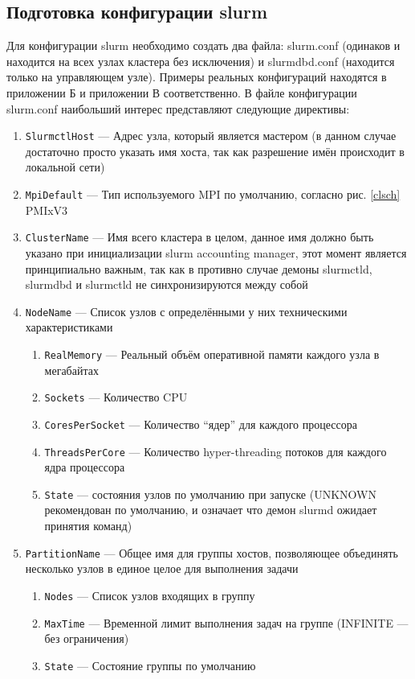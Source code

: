 \documentclass[a4paper]{extarticle}
\begin{document}
\subsection{Подготовка конфигурации slurm}

Для конфигурации slurm необходимо создать два файла: slurm.conf (одинаков и находится на всех узлах кластера без исключения) и slurmdbd.conf (находится только на управляющем узле).  Примеры реальных конфигураций находятся в приложении Б и приложении В соответственно.
В файле конфигурации slurm.conf наибольший интерес представляют следующие директивы:

\begin{enumerate}[label*=\arabic*.]
\item\texttt{SlurmctlHost} --- Адрес узла, который является мастером (в данном случае достаточно просто указать имя хоста, так как разрешение имён происходит в локальной сети)
\item\texttt{MpiDefault} --- Тип используемого MPI по умолчанию, согласно рис. \ref{clsch} PMIxV3
\item\texttt{ClusterName} --- Имя всего кластера в целом, данное имя должно быть указано при инициализации slurm accounting manager, этот момент является принципиально важным, так как в противно случае демоны slurmctld, slurmdbd и slurmctld не синхронизируются между собой
\item\texttt{NodeName} --- Список узлов с определёнными у них техническими характеристиками
\begin{enumerate}[label*=\arabic*.]
\item\texttt{RealMemory} --- Реальный объём оперативной памяти каждого узла в мегабайтах
\item\texttt{Sockets} --- Количество CPU
\item\texttt{CoresPerSocket} --- Количество \enquote{ядер} для каждого процессора
\item\texttt{ThreadsPerCore} --- Количество  hyper-threading  потоков для каждого ядра процессора
\item\texttt{State} --- состояния узлов по умолчанию при запуске (UNKNOWN рекомендован по умолчанию, и означает что демон slurmd ожидает принятия команд)
\end{enumerate}
\item\texttt{PartitionName} --- Общее имя для группы хостов, позволяющее объединять несколько узлов в единое целое для выполнения задачи
\begin{enumerate}[label*=\arabic*.]
\item\texttt{Nodes} --- Список узлов входящих в группу
\item\texttt{MaxTime} --- Временной лимит выполнения задач на группе (INFINITE --- без ограничения)
\item\texttt{State} --- Состояние группы по умолчанию
\end{enumerate}
\end{enumerate}
\end{document}
